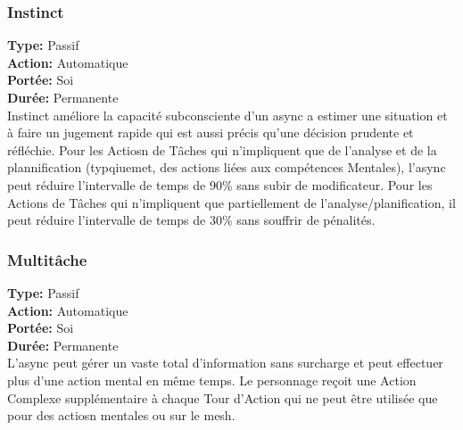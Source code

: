 \subsubsection{Instinct} \textbf{Type:} Passif \\ \textbf{Action:} Automatique \\ \textbf{Portée:} Soi \\ \textbf{Durée:} Permanente \\ Instinct améliore la capacité subconsciente d'un async a estimer une situation et à faire un jugement rapide qui est aussi précis qu'une décision prudente et réfléchie. Pour les Actiosn de Tâches qui n'impliquent que de l'analyse et de la plannification (typqiuemet, des actions liées aux compétences Mentales), l'async peut réduire l'intervalle de temps de 90\% sans subir de modificateur. Pour les Actions de Tâches qui n'impliquent que partiellement de l'analyse/planification, il peut réduire l'intervalle de temps de 30\% sans souffrir de pénalités. 

\subsubsection{Multitâche} \textbf{Type:} Passif \\ \textbf{Action:} Automatique \\ \textbf{Portée:} Soi \\ \textbf{Durée:} Permanente \\ L'async peut gérer un vaste total d'information sans surcharge et peut effectuer plus d'une action mental en même temps. Le personnage reçoit une Action Complexe supplémentaire à chaque Tour d'Action qui ne peut être utilisée que pour des actiosn mentales ou sur le mesh. 

